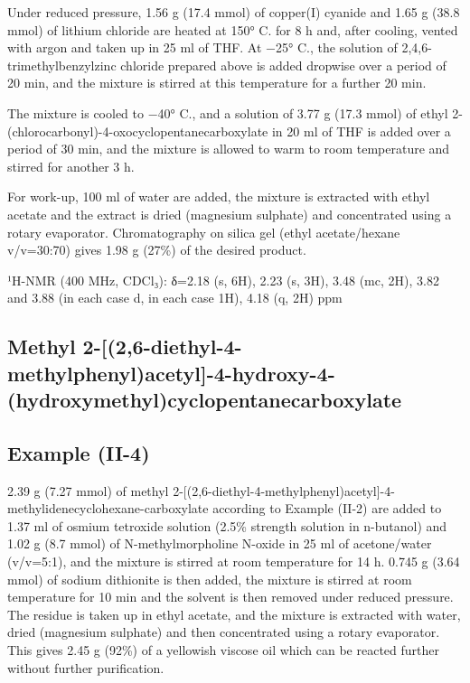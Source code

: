 \documentclass[11pt,a4paper]{article}
\begin{document}
Under reduced pressure, 1.56 g (17.4 mmol) of copper(I) cyanide and 1.65 g (38.8 mmol) of lithium chloride are heated at 150° C. for 8 h and, after cooling, vented with argon and taken up in 25 ml of THF. At −25° C., the solution of 2,4,6-trimethylbenzylzinc chloride prepared above is added dropwise over a period of 20 min, and the mixture is stirred at this temperature for a further 20 min.

The mixture is cooled to −40° C., and a solution of 3.77 g (17.3 mmol) of ethyl 2-(chlorocarbonyl)-4-oxocyclopentanecarboxylate in 20 ml of THF is added over a period of 30 min, and the mixture is allowed to warm to room temperature and stirred for another 3 h.

For work-up, 100 ml of water are added, the mixture is extracted with ethyl acetate and the extract is dried (magnesium sulphate) and concentrated using a rotary evaporator. Chromatography on silica gel (ethyl acetate/hexane v/v=30:70) gives 1.98 g (27\%) of the desired product.

¹H-NMR (400 MHz, CDCl₃): δ=2.18 (s, 6H), 2.23 (s, 3H), 3.48 (mc, 2H), 3.82 and 3.88 (in each case d, in each case 1H), 4.18 (q, 2H) ppm

\subsection{Methyl 2-[(2,6-diethyl-4-methylphenyl)acetyl]-4-hydroxy-4-(hydroxymethyl)cyclopentanecarboxylate}

\subsection{Example (II-4)}

2.39 g (7.27 mmol) of methyl 2-[(2,6-diethyl-4-methylphenyl)acetyl]-4-methylidenecyclohexane-carboxylate according to Example (II-2) are added to 1.37 ml of osmium tetroxide solution (2.5\% strength solution in n-butanol) and 1.02 g (8.7 mmol) of N-methylmorpholine N-oxide in 25 ml of acetone/water (v/v=5:1), and the mixture is stirred at room temperature for 14 h. 0.745 g (3.64 mmol) of sodium dithionite is then added, the mixture is stirred at room temperature for 10 min and the solvent is then removed under reduced pressure. The residue is taken up in ethyl acetate, and the mixture is extracted with water, dried (magnesium sulphate) and then concentrated using a rotary evaporator. This gives 2.45 g (92\%) of a yellowish viscose oil which can be reacted further without further purification.
\end{document}
